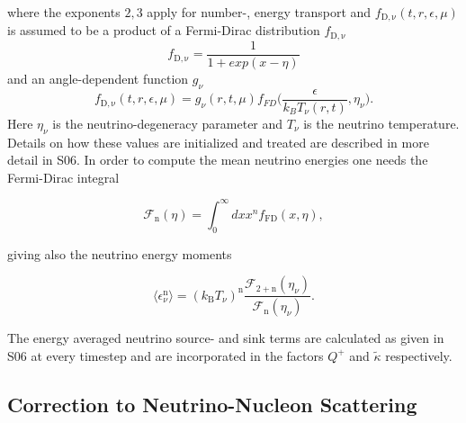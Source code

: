 \documentclass[fleqn,usenatbib]{mnras}
\begin{document}
\begin{appendices}
 where the exponents $2,3$ apply for number-, energy transport and $f_{\mathrm{D,\nu}}(t, r, \epsilon, \mu)$ is assumed to be a product of a Fermi-Dirac distribution $f_{\mathrm{D,\nu}}$
\begin{equation}
  \label{equ:fermi-dirac}
  f_{\mathrm{D,\nu}} = \frac{1}{1+exp(x-\eta)}
\end{equation}
 and an angle-dependent function $g_{\nu}$
 \begin{equation}
  \label{equ:fermi-dirac-g}
  f_{\mathrm{D,\nu}}(t, r, \epsilon, \mu) = g_{\nu}(r,t,\mu)f_{FD}\Big( \frac{\epsilon}{k_B T_{\nu}(r,t)},\eta_{\nu} \Big).
\end{equation}
 Here $\eta_{\nu}$ is the neutrino-degeneracy parameter and $T_{\nu}$ is the neutrino temperature. Details on how these values are initialized and treated are described in more detail in S06. In order to compute the mean neutrino energies one needs the Fermi-Dirac integral

\begin{equation}
    \label{equ:fermi-dirac-integral}
    \mathcal{F}_{\mathrm{n}}(\eta) = \int_0^{\infty}dx x^n f_{\mathrm{FD}}(x,\eta),
\end{equation}

giving also the neutrino energy moments

 \begin{equation}
  \label{equ:energy-moments}
  \langle \epsilon^{\mathrm{n}}_{\nu} \rangle = (k_{\mathrm{B}} T_{\nu})^{\mathrm{n}} \frac{\mathcal{F}_{\mathrm{2+n}}(\eta_{\nu})}{\mathcal{F}_{\mathrm{n}}(\eta_{\nu})}.
\end{equation}

 The energy averaged neutrino source- and sink terms are calculated as given in S06 at every timestep and are incorporated in the factors $Q^+$ and $\tilde{\kappa} $ respectively.


\subsection{Correction to Neutrino-Nucleon Scattering}


\end{appendices}
\end{document}
